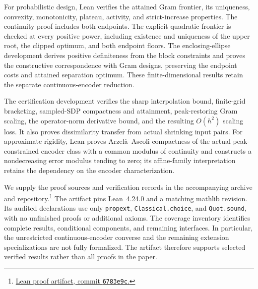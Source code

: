 For probabilistic design, Lean verifies the attained Gram frontier, its uniqueness, convexity, monotonicity, plateau, activity, and strict-increase properties. The continuity proof includes both endpoints. The explicit quadratic frontier is checked at every positive power, including existence and uniqueness of the upper root, the clipped optimum, and both endpoint floors. The enclosing-ellipse development derives positive definiteness from the block constraints and proves the constructive correspondence with Gram designs, preserving the endpoint costs and attained separation optimum. These finite-dimensional results retain the separate continuous-encoder reduction.

The certification development verifies the sharp interpolation bound, finite-grid bracketing, sampled-SDP compactness and attainment, peak-restoring Gram scaling, the operator-norm derivative bound, and the resulting $O(h^2)$ scaling loss. It also proves dissimilarity transfer from actual shrinking input pairs. For approximate rigidity, Lean proves Arzel\`a--Ascoli compactness of the actual peak-constrained encoder class with a common modulus of continuity and constructs a nondecreasing error modulus tending to zero; its affine-family interpretation retains the dependency on the encoder characterization.

We supply the proof sources and verification records in the accompanying archive and repository.\footnote{\href{https://github.com/SaeedRazavikia/Optimal-Continuous-Analog-Encoders-TIT-/tree/6783e9c68823213e2f4bc31259ab6a1ad6072d89/formalization}{Lean proof artifact, commit \texttt{6783e9c}.}} The artifact pins Lean~4.24.0 and a matching mathlib revision. Its audited declarations use only \texttt{propext}, \texttt{Classical.choice}, and \texttt{Quot.sound}, with no unfinished proofs or additional axioms. The coverage inventory identifies complete results, conditional components, and remaining interfaces. In particular, the unrestricted continuous-encoder converse and the remaining extension specializations are not fully formalized. The artifact therefore supports selected verified results rather than all proofs in the paper.
